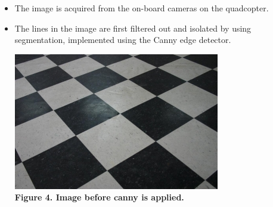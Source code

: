 \documentclass[12pt]{article}
\begin{document}
\begin{itemize}
  \item The image is acquired from the on-board cameras on the quadcopter.
  \item The lines in the image are first filtered out and isolated by using segmentation, implemented using the Canny edge detector. 
    \begin{center}\includegraphics{image25} \\
    \textbf{Figure 4. Image before canny is applied.}\end{center}
    

\end{itemize}
\end{document}
